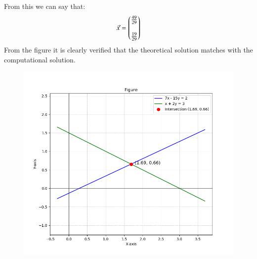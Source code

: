 \documentclass[journal]{IEEEtran}
\theoremstyle{remark}
\begin{document}
From this we can say that:
\begin{align}
    \Vec{x}=\begin{pmatrix}\frac{49}{29}\\\\ \frac{19}{29}\end{pmatrix}
\end{align}
From the figure it is clearly verified that the theoretical solution matches with the computational solution.\\
\begin{figure}[h]
    \centering
    \includegraphics[height=0.5\textheight, keepaspectratio]{figs/figure1.png}
    \label{figure_1}
\end{figure}
\end{document}

